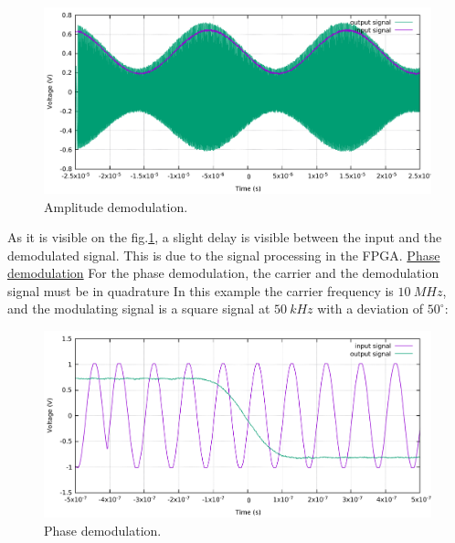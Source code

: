 \documentclass[12pt,oneside]{article}
\begin{document}
\begin{figure}[!h!tb]
	\begin{center}
		\includegraphics[width=13cm,trim={0cm 0cm 0cm 0cm}, clip]{scope/demodampl.pdf}
		\caption{Amplitude demodulation.}
		\label{curv:demodampl}
	\end{center}
\end{figure}
\vspace{-0.8cm}
As it is visible on the fig.\ref{curv:demodampl}, a slight delay is visible between the input and the demodulated signal. This is due to the signal processing in the FPGA. 
\vspace{-0.1cm}
\newline\newline
\vspace{-0.1cm}
\underline{Phase demodulation}\newline\newline
For the phase demodulation, the carrier and the demodulation signal must be in quadrature In this example the carrier frequency is $10~MHz$, and the modulating signal is a square signal at $50~kHz$ with a deviation of $50^\circ$:

\begin{figure}[!h!tb]
	\begin{center}
		\includegraphics[width=13cm,trim={0cm 0cm 0cm 0cm}, clip]{scope/demodphcar.pdf}
		\caption{Phase demodulation.}
		\label{curv:demodph}
	\end{center}
\end{figure}
\end{document}
